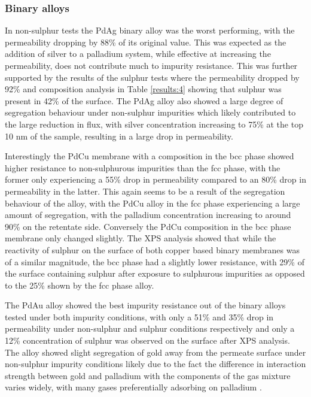 \subsubsection{Binary alloys}
In non-sulphur tests the PdAg binary alloy was the worst performing, with the permeability dropping by 88\% of its original value. This was expected as the addition of silver to a palladium system, while effective at increasing the permeability, does not contribute much to impurity resistance. \cite{Peters2016b} This was further supported by the results of the sulphur tests where the permeability dropped by 92\% and composition analysis in Table \ref{results:4} showing that sulphur was present in 42\% of the surface. The PdAg alloy also showed a large degree of segregation behaviour under non-sulphur impurities which likely contributed to the large reduction in flux, with silver concentration increasing to 75\% at the top 10 nm of the sample, resulting in a large drop in permeability. 

Interestingly the PdCu membrane with a composition in the bcc phase showed higher resistance to non-sulphurous impurities than the fcc phase, with the former only experiencing a 55\% drop in permeability compared to an 80\% drop in permeability in the latter. This again seems to be a result of the segregation behaviour of the alloy, with the PdCu alloy in the fcc phase experiencing a large amount of segregation, with the palladium concentration increasing to around 90\% on the retentate side. Conversely the PdCu composition in the bcc phase membrane only changed slightly. The XPS analysis showed that while the reactivity of sulphur on the surface of both copper based binary membranes was of a similar magnitude, the bcc phase had a slightly lower resistance, with 29\% of the surface containing sulphur after exposure to sulphurous impurities as opposed to the 25\% shown by the fcc phase alloy.

The PdAu alloy showed the best impurity resistance out of the binary alloys tested under both impurity conditions, with only a 51\% and 35\% drop in permeability under non-sulphur and sulphur conditions respectively and only a 12\% concentration of sulphur was observed on the surface after XPS analysis. The alloy showed slight segregation of gold away from the permeate surface under non-sulphur impurity conditions likely due to the fact the difference in interaction strength between gold and palladium with the components of the gas mixture varies widely, with many gases preferentially adsorbing on palladium \cite{Gade2011}.

